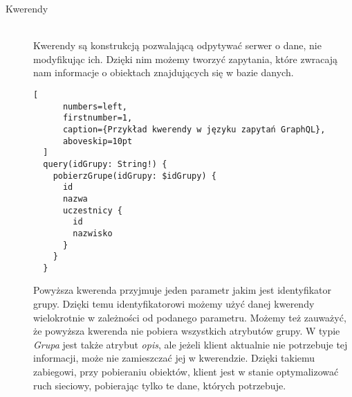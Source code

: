 \begin{description}
  \item[Kwerendy] \hfill \\ Kwerendy są konstrukcją pozwalającą odpytywać serwer o dane, nie modyfikując ich. Dzięki nim możemy tworzyć zapytania, które zwracają nam informacje o obiektach znajdujących się w bazie danych.
  \begin{addmargin}[6mm]{0mm}
  \begin{lstlisting}[
      numbers=left,
      firstnumber=1,
      caption={Przykład kwerendy w języku zapytań GraphQL},
      aboveskip=10pt
  ]
  query(idGrupy: String!) {
    pobierzGrupe(idGrupy: $idGrupy) {
      id
      nazwa
      uczestnicy {
        id
        nazwisko
      }
    }
  }
  \end{lstlisting}
  \end{addmargin}

  Powyższa kwerenda przyjmuje jeden parametr jakim jest identyfikator grupy. Dzięki temu identyfikatorowi możemy użyć danej kwerendy wielokrotnie w zależności od podanego parametru. Możemy też zauważyć, że powyższa kwerenda nie pobiera wszystkich atrybutów grupy. W typie \emph{Grupa} jest także atrybut \emph{opis}, ale jeżeli klient aktualnie nie potrzebuje tej informacji, może nie zamieszczać jej w kwerendzie. Dzięki takiemu zabiegowi, przy pobieraniu obiektów, klient jest w stanie optymalizować ruch sieciowy, pobierając tylko te dane, których potrzebuje.

  
\end{description}
